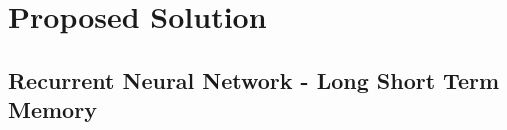 \section{Proposed Solution}
\label{sec:solution}

\subsection{Recurrent Neural Network - Long Short Term Memory}

